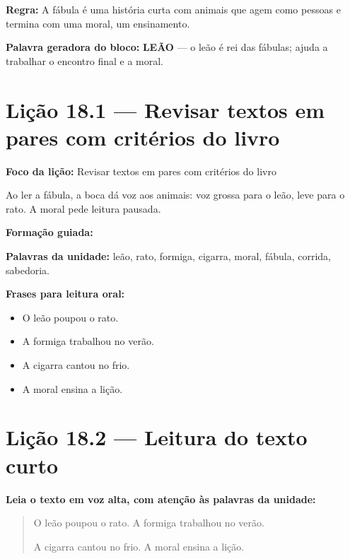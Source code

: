 \textbf{Regra:} A fábula é uma história curta com animais que agem como pessoas e termina com uma moral, um ensinamento.

\textbf{Palavra geradora do bloco:} \textbf{LEÃO} --- o leão é rei das fábulas; ajuda a trabalhar o encontro final e a moral.

\section{Lição 18.1 --- Revisar textos em pares com critérios do livro}

\textbf{Foco da lição:} Revisar textos em pares com critérios do livro


\begin{boquinha}
Ao ler a fábula, a boca dá voz aos animais: voz grossa para o leão, leve para o rato. A moral pede leitura pausada.
\end{boquinha}

\noindent\textbf{Formação guiada:}

\begin{center}
\end{center}

\noindent\textbf{Palavras da unidade:} leão, rato, formiga, cigarra, moral, fábula, corrida, sabedoria.

\noindent\textbf{Frases para leitura oral:}
\begin{itemize}[leftmargin=1.6em]
  \item O leão poupou o rato.
  \item A formiga trabalhou no verão.
  \item A cigarra cantou no frio.
  \item A moral ensina a lição.
\end{itemize}

\section{Lição 18.2 --- Leitura do texto curto}

\noindent\textbf{Leia o texto em voz alta, com atenção às palavras da unidade:}


\begin{quote}
O leão poupou o rato. A formiga trabalhou no verão.

A cigarra cantou no frio. A moral ensina a lição.
\end{quote}

